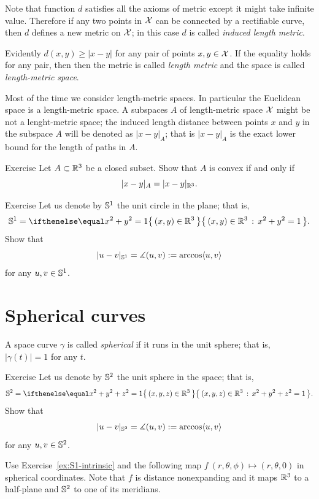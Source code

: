Note that function $d$ satisfies all the axioms of metric except it might take infinite value.
Therefore if any two points in $\mathcal{X}$ can be connected by a rectifiable curve, then $d$ defines a new metric on $\mathcal{X}$; in this case $d$ is called \emph{induced length metric}.

Evidently $d(x,y)\ge |x-y|$ for any pair of points $x,y\in \mathcal{X}$.
If the equality holds for any pair, then then the metric is called \emph{length metric} and the space is called \emph{length-metric space}.

Most of the time we consider length-metric spaces.
In particular the Euclidean space is a length-metric space.
A subspaces $A$ of length-metric space $\mathcal{X}$ might be not a lenght-metric space;
the induced length distance between points $x$ and $y$ in the subspace $A$ will be denoted as $|x-y|_A$;
that is $|x-y|_A$ is the exact lower bound for the length of paths in $A$.

\begin{thm}{Exercise}\label{ex:intrinsic-convex}
Let $A\subset \mathbb{R}^3$ be a closed subset.
Show that $A$ is convex if and only if
\[|x-y|_A=|x-y|_{\mathbb{R}^3}.\]
\end{thm}

\begin{thm}{Exercise}\label{ex:S1-intrinsic}
Let us denote by $\mathbb{S}^1$ the unit circle in the plane; that is,
\[\SS^1=\set{(x,y)\in\RR^3}{x^2+y^2=1}.\]
Show that
\[|u-v|_{\mathbb{S}^1}=\measuredangle(u,v):=\arccos\langle u,v\rangle\]
for any $u,v\in \mathbb{S}^1$.
\end{thm}

\section*{Spherical curves}

A space curve $\gamma$ is called \emph{spherical} if it runs in the unit sphere;
that is, $|\gamma(t)|=1$ for any $t$.

\begin{thm}{Exercise}\label{ex:S2-intrinsic}
Let us denote by $\mathbb{S}^2$ the unit sphere in the space; that is,
\[\SS^2=\set{(x,y,z)\in\RR^3}{x^2+y^2+z^2=1}.\]
Show that
\[|u-v|_{\mathbb{S}^2}=\measuredangle(u,v):=\arccos\langle u,v\rangle\]
for any $u,v\in \mathbb{S}^2$.
\end{thm} %

 Use Exercise~\ref{ex:S1-intrinsic} and the following map $f\:(r,\theta,\phi)\mapsto (r,\theta,0)$ in spherical coordinates. Note that $f$ is distance nonexpanding and it maps $\mathbb{R}^3$ to a half-plane and $\mathbb{S}^2$ to one of its meridians.

